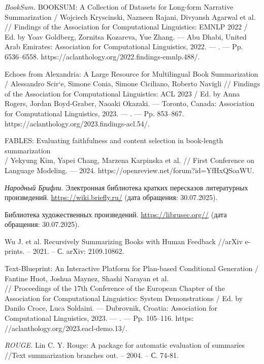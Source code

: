 \documentclass{article}
\begin{document}
\begin{thebibliography}{99}
\textit{BookSum.}  
BOOKSUM: A Collection of Datasets for Long-form Narrative Summarization / Wojciech Kryscinski, Nazneen Rajani, Divyansh Agarwal et al. // Findings of the Association for Computational Linguistics: EMNLP 2022 / Ed. by Yoav Goldberg, Zornitsa Kozareva, Yue Zhang. — Abu Dhabi, United Arab Emirates: Association for Computational Linguistics, 2022. — . — Pp. 6536–6558. https://aclanthology.org/2022.findings-emnlp.488/.

Echoes from Alexandria: A Large Resource for Multilingual Book Summarization / Alessandro Scir`e, Simone Conia, Simone Ciciliano, Roberto Navigli // Findings of the Association for Computational Linguistics: ACL 2023 / Ed. by Anna Rogers, Jordan Boyd-Graber, Naoaki Okazaki. — Toronto, Canada: Association for Computational Linguistics, 2023. — . — Pp. 853–867. https://aclanthology.org/2023.findings-acl.54/.

FABLES: Evaluating faithfulness and content selection in book-length summarization \\/ Yekyung Kim, Yapei Chang, Marzena Karpinska et al. // First Conference on Language Modeling. — 2024. https://openreview.net/forum?id=YfHxQSoaWU.

\textit{Народный Брифли.}  
Электронная библиотека кратких пересказов литературных произведений.  
\url{https://wiki.briefly.ru/} (дата обращения: 30.07.2025).

Библиотека художественных произведений.  
\url{https://librusec.org//} (дата обращения: 30.07.2025).

Wu J. et al. Recursively Summarizing Books with Human Feedback //arXiv e-prints. – 2021. – С. arXiv: 2109.10862.

Text-Blueprint: An Interactive Platform for Plan-based Conditional Generation / Fantine Huot, Joshua Maynez, Shashi Narayan et al. \\// Proceedings of the 17th Conference of the European Chapter of the Association for Computational Linguistics:
System Demonstrations / Ed. by Danilo Croce, Luca Soldaini. — Dubrovnik, Croatia: Association for Computational Linguistics, 2023. — . — Pp. 105–116. https:
//aclanthology.org/2023.eacl-demo.13/.

\textit{ROUGE.}
Lin C. Y. Rouge: A package for automatic evaluation of summaries //Text summarization branches out. – 2004. – С. 74-81.


\end{thebibliography}
\end{document}
